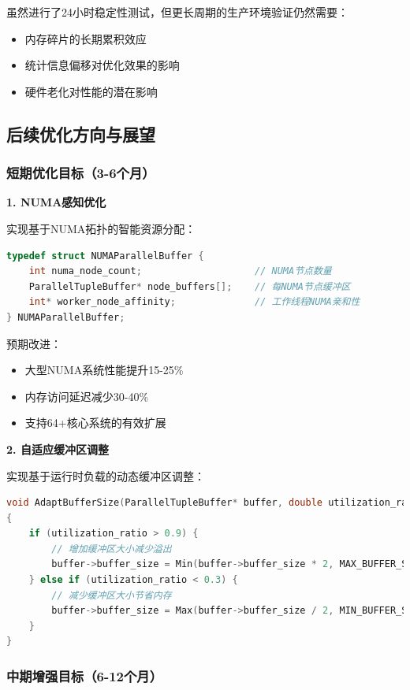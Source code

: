 虽然进行了24小时稳定性测试，但更长周期的生产环境验证仍然需要：
\begin{itemize}
    \item 内存碎片的长期累积效应
    \item 统计信息偏移对优化效果的影响
    \item 硬件老化对性能的潜在影响
\end{itemize}

\subsection{后续优化方向与展望}

\subsubsection{短期优化目标（3-6个月）}

\textbf{1. NUMA感知优化}

实现基于NUMA拓扑的智能资源分配：
\begin{lstlisting}[language=C, caption=NUMA感知缓冲区分配]
typedef struct NUMAParallelBuffer {
    int numa_node_count;                    // NUMA节点数量
    ParallelTupleBuffer* node_buffers[];    // 每NUMA节点缓冲区
    int* worker_node_affinity;              // 工作线程NUMA亲和性
} NUMAParallelBuffer;
\end{lstlisting}

预期改进：
\begin{itemize}
    \item 大型NUMA系统性能提升15-25\%
    \item 内存访问延迟减少30-40\%
    \item 支持64+核心系统的有效扩展
\end{itemize}

\textbf{2. 自适应缓冲区调整}

实现基于运行时负载的动态缓冲区调整：
\begin{lstlisting}[language=C, caption=自适应缓冲区大小调整]
void AdaptBufferSize(ParallelTupleBuffer* buffer, double utilization_ratio)
{
    if (utilization_ratio > 0.9) {
        // 增加缓冲区大小减少溢出
        buffer->buffer_size = Min(buffer->buffer_size * 2, MAX_BUFFER_SIZE);
    } else if (utilization_ratio < 0.3) {
        // 减少缓冲区大小节省内存
        buffer->buffer_size = Max(buffer->buffer_size / 2, MIN_BUFFER_SIZE);
    }
}
\end{lstlisting}

\subsubsection{中期增强目标（6-12个月）}

